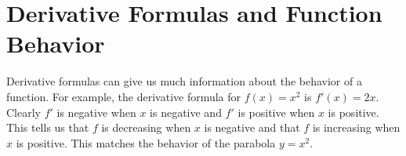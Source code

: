 \documentclass[12pt,]{book}
\theoremstyle{plain}
\theoremstyle{definition}
\numberwithin{equation}{section}
\newcommand{\fe}[2]{#1\mathopen{}\left(#2\right)\mathclose{}}
\newcommand{\fd}[1]{#1'}
\begin{document}
\section[Derivative Formulas and Function Behavior]{Derivative Formulas and Function Behavior}\label{section-derivative-formulas-and-function-behavior}
Derivative formulas can give us much information about the behavior of a function.  For example, the derivative formula for \(\fe{f}{x}=x^2\) is \(\fe{\fd{f}}{x}=2x\).  Clearly \(\fd{f}\) is negative when \(x\) is negative and \(\fd{f}\) is positive when \(x\) is positive.  This tells us that \(f\) is decreasing when \(x\) is negative and that \(f\) is increasing when \(x\) is positive.  This matches the behavior of the parabola \(y=x^2\).%
\typeout{************************************************}
\typeout{************************************************}
\end{document}
